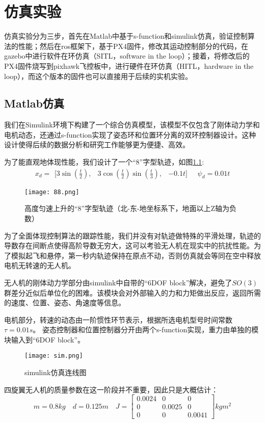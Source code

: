 \chapter{仿真实验}
仿真实验分为三步，首先在Matlab中基于s-function和simulink仿真，验证控制算法的性能；然后在ros框架下，基于PX4固件，修改其运动控制部分的代码，在gazebo中进行软件在环仿真（SITL，software in the loop）；接着，将修改后的PX4固件烧写到pixhawk飞控板中，进行硬件在环仿真（HITL，hardware in the loop），而这个版本的固件也可以直接用于后续的实机实验。
\section{Matlab仿真}
我们在Simulink环境下构建了一个综合仿真模型，该模型不仅包含了刚体动力学和电机动态，还通过s-function实现了姿态环和位置环分离的双环控制器设计。这种设计使得后续的数据分析和研究工作能够更为便捷、高效。

为了能直观地体现性能，我们设计了一个“8”字型轨迹，如图\ref{fig:8}:
$$x_d = \begin{matrix}[3\sin(\frac{t}{2}), & 3\cos(\frac{t}{2})\sin(\frac{t}{3}), &-0.1t]\end{matrix}
\quad
\psi_d=0.01t$$

\begin{figure}[!h]
  \centering
  \texttt{[image: 88.png]}
  \caption{高度匀速上升的“8”字型轨迹（北-东-地坐标系下，地面以上Z轴为负数）}
  \label{fig:8}
\end{figure}

为了全面体现控制算法的跟踪性能，我们并没有对轨迹做特殊的平滑处理，轨迹的导数存在间断点使得高阶导数无穷大，这可以考验无人机在现实中的抗扰性能。为了模拟起飞和悬停，第一秒内轨迹保持在原点不动，否则仿真就会等同在空中释放电机无转速的无人机。


  无人机的刚体动力学部分由simulink中自带的“6DOF block”解决，避免了$SO(3)$群差分近似后单位化的困难。该模块会对外部输入的力和力矩做出反应，返回所需的速度、位置、姿态、角速度等信息。

  电机部分，转速的动态由一阶惯性环节表示，根据所选电机型号时间常数$\tau=0.01s$。
  姿态控制器和位置控制器分开由两个s-function实现，重力由单独的模块输入到“6DOF block”。
  \begin{figure}[!h]
    \centering
    \texttt{[image: sim.png]}
    \caption{simulink仿真连线图}
    \label{fig:sim}
  \end{figure}

  四旋翼无人机的质量参数在这一阶段并不重要，因此只是大概估计：
  $$m=0.8kg \quad d=0.125m \quad J=\begin{bmatrix}
    0.0024   &      0  &       0\\
    0 &   0.0025      &   0\\
    0  &       0   & 0.0041
  \end{bmatrix}kg m^2$$

